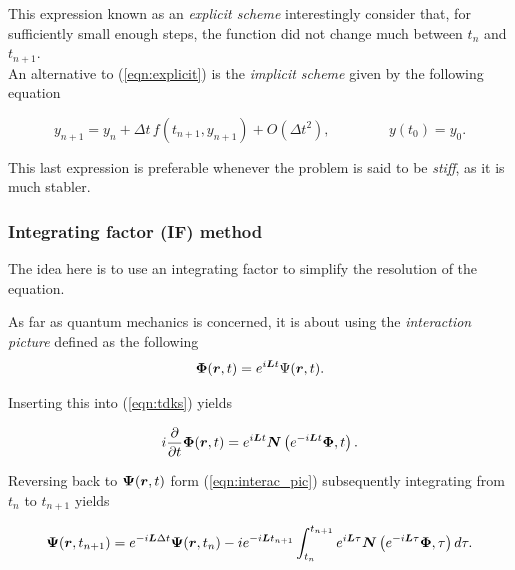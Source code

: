 \noindent This expression known as an \emph{explicit scheme}
interestingly consider that, for sufficiently small enough steps,
the function did not change much between $t_n$ and $t_{n+1}$. \\

An alternative to (\ref{eqn:explicit}) is the \emph{implicit scheme}
given by the following equation

\begin{equation}
   y_{n+1} = y_n + \Delta t\,f(t_{n+1},y_{n+1}) + O(\Delta t^2),
  \hspace{50pt} y(t_0)=y_0.
   \label{eqn:implicit}
\end{equation}

\noindent This last expression is preferable whenever 
the problem is said to be \emph{stiff}, as it is much stabler.



\subsubsection{Integrating factor (IF) method}

The idea here is to use an integrating factor to simplify the resolution 
of the equation.

\noindent As far as quantum mechanics is concerned,
it is about using the \emph{interaction picture} defined as the following
\begin{equation}
   \boldsymbol{\rm \Phi}(\boldsymbol{r},t) 
      = e^{i\boldsymbol{L}t}{\boldsymbol\rm\Psi} (\boldsymbol{r},t).
     \label{eqn:interac_pic}
\end{equation}

Inserting this into (\ref{eqn:tdks}) yields

\begin{equation}
   i\frac{\partial}{\partial t}\boldsymbol{\rm \Phi}(\boldsymbol{r},t) 
      = e^{i\boldsymbol{L}t}
    \boldsymbol{N}\left( e^{-i\boldsymbol{L}t}\boldsymbol{\rm\Phi},t\right).
     \label{eqn:base_if}
\end{equation}

Reversing back to $\boldsymbol{\rm \Psi}(\boldsymbol{r},t)$
form (\ref{eqn:interac_pic}) subsequently 
integrating from $t_n$ to $t_{n+1}$ yields

\begin{equation}
   \boldsymbol{\rm \Psi}(\boldsymbol{r},t_{n+1}) 
      = e^{-i\boldsymbol{L}\Delta t}
   \boldsymbol{\rm \Psi}(\boldsymbol{r},t_n) 
      -i e^{-i\boldsymbol{L}t_{n+1}}
      \int_{t_n}^{t_{n+1}} e^{i\boldsymbol{L}\tau}
    \boldsymbol{N}\left(  e^{-i\boldsymbol{L}\tau}
     \boldsymbol{\rm\Phi},\tau\right)d\tau.
     \label{eqn:if_step}
\end{equation}


